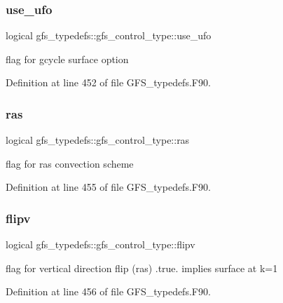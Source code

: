 \subsubsection{use\+\_\+ufo}
{\footnotesize\ttfamily logical gfs\+\_\+typedefs\+::gfs\+\_\+control\+\_\+type\+::use\+\_\+ufo}



flag for gcycle surface option 



Definition at line 452 of file G\+F\+S\+\_\+typedefs.\+F90.

\mbox{\label{structgfs__typedefs_1_1gfs__control__type_a1ee163c48528bf9abec2d84ee6f8964a}} 
\subsubsection{ras}
{\footnotesize\ttfamily logical gfs\+\_\+typedefs\+::gfs\+\_\+control\+\_\+type\+::ras}



flag for ras convection scheme 



Definition at line 455 of file G\+F\+S\+\_\+typedefs.\+F90.

\mbox{\label{structgfs__typedefs_1_1gfs__control__type_a370fc5a41005e5b4d999543b3f7fb104}} 
\subsubsection{flipv}
{\footnotesize\ttfamily logical gfs\+\_\+typedefs\+::gfs\+\_\+control\+\_\+type\+::flipv}



flag for vertical direction flip (ras) .true. implies surface at k=1 



Definition at line 456 of file G\+F\+S\+\_\+typedefs.\+F90.

\mbox{\label{structgfs__typedefs_1_1gfs__control__type_a1a9708b569d806e7a5a080827762b94f}} 
